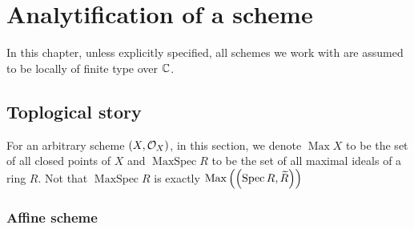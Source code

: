 \chapter{Analytification of a scheme}

In this chapter, unless explicitly specified, all schemes we work with are assumed to be locally of finite type over $\mathbb{C}$.

\section{Toplogical story}

For an arbitrary scheme $\left(X, \mathcal{O}_{X}\right)$, in this section, we denote $\operatorname{Max}{X}$ to be the set of all closed points of $X$ and $\operatorname{MaxSpec} R$ to be the set of all maximal ideals of a ring $R$. Not that $\operatorname{MaxSpec} R$ is exactly $\operatorname{Max}\left(\left(\operatorname*{Spec}{R}, \widetilde{R}\right)\right)$

\subsection{Affine scheme}

\begin{theorem}

\end{theorem}
